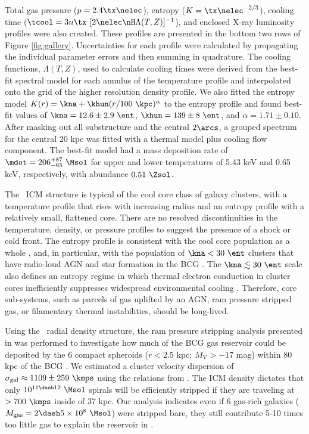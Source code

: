 \documentclass[useAMS,usenatbib]{mn2e}
\begin{document}
Total gas pressure ($p = 2.4 \tx \nelec$), entropy ($K =
\tx\nelec^{-2/3}$), cooling time ($\tcool = 3n\tx~[2\nelec \nH
  \Lambda(T,Z)]^{-1}$), and enclosed X-ray luminosity profiles were
also created. These profiles are presented in the bottom two rows of
Figure \ref{fig:gallery}. Uncertainties for each profile were
calculated by propagating the individual parameter errors and then
summing in quadrature. The cooling functions, $\Lambda(T,Z)$, used to
calculate cooling times were derived from the best-fit spectral model
for each annulus of the temperature profile and interpolated onto the
grid of the higher resolution density profile. We also fitted the
entropy model $K(r) = \kna +\khun (r/100 ~\kpc)^{\alpha}$ to the
entropy profile and found best-fit values of $\kna = 12.6 \pm 2.9
~\ent$, $\khun = 139 \pm 8 ~\ent$, and $\alpha = 1.71 \pm 0.10$.
After masking out all substructure and the central $2\arcs$, a grouped
spectrum for the central 20 kpc was fitted with a thermal model plus
cooling flow component. The best-fit model had a mass deposition rate
of $\mdot = 206^{+87}_{-65} ~\Msol$ for upper and lower temperatures
of 5.43 keV and 0.65 keV, respectively, with abundance $0.51 ~\Zsol$.

The \rxj\ ICM structure is typical of the cool core class of galaxy
clusters, with a temperature profile that rises with increasing radius
and an entropy profile with a relatively small, flattened core. There
are no resolved discontinuities in the temperature, density, or
pressure profiles to suggest the presence of a shock or cold front.
The entropy profile is consistent with the cool core population as a
whole \citep{accept}, and, in particular, with the population of $\kna
< 30 ~\ent$ clusters that have radio-loud AGN and star formation in
the BCG \citep{haradent}. The $\kna \la 30 ~\ent$ scale also defines
an entropy regime in which thermal electron conduction in cluster
cores inefficiently suppresses widespread environmental cooling
\citep{conduction}. Therefore, core sub-systems, such as parcels of
gas uplifted by an AGN, ram pressure stripped gas, or filamentary
thermal instabilities, should be long-lived.

Using the \rxj\ radial density structure, the ram pressure stripping
analysis presented in \citet{a1664} was performed to investigate how
much of the BCG gas reservoir could be deposited by the 6 compact
spheroids ($r < 2.5$ kpc; $M_{\mathrm{V}} > -17$ mag) within 80 kpc of
the BCG \citep{1996AJ....111..649S, 1999Ap&SS.266..113A}. We estimated
a cluster velocity dispersion of $\sigma_{\mathrm{gal}} \approx 1109
\pm 259 ~\kmps$ using the relations from
\citet{2000MNRAS.318..715X}. The ICM density dictates that only
$10^{11 \dash 12} ~\Msol$ spirals will be efficiently stripped if they
are traveling at $> 700 ~\kmps$ inside of 37 kpc. Our analysis
indicates even if 6 gas-rich galaxies ($M_{\mathrm{gas}} = 2 \dash 5
\times 10^8 ~\Msol$) were stripped bare, they still contribute 5-10
times too little gas to explain the reservoir in \irs.
\end{document}
